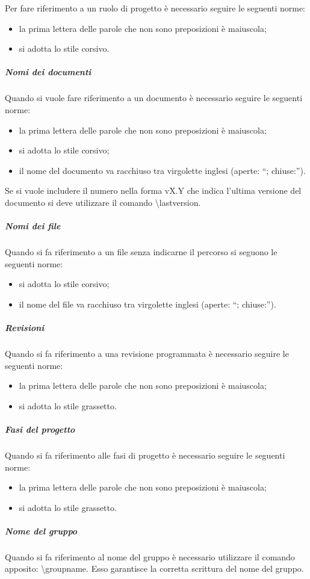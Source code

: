 					Per fare riferimento a un ruolo di progetto è necessario seguire le seguenti norme:
					\begin{itemize}
						\item la prima lettera delle parole che non sono preposizioni è maiuscola;
						\item si adotta lo stile corsivo.
					\end{itemize}
				\subparagraph{Nomi dei documenti}
					Quando si vuole fare riferimento a un documento è necessario seguire le seguenti norme:
					\begin{itemize}
						\item la prima lettera delle parole che non sono preposizioni è maiuscola;
						\item si adotta lo stile corsivo;
						\item il nome del documento va racchiuso tra virgolette inglesi (aperte: “; chiuse:”).
					\end{itemize}
					Se si vuole includere il numero nella forma vX.Y che indica l’ultima versione del documento si deve utilizzare il comando \latex{} \textbackslash lastversion{}.
				\subparagraph{Nomi dei file}
					Quando si fa riferimento a un file senza indicarne il percorso si seguono le seguenti norme:
					\begin{itemize}
						\item si adotta lo stile corsivo;
						\item il nome del file va racchiuso tra virgolette inglesi (aperte: “; chiuse:”).
					\end{itemize}
				\subparagraph{Revisioni}
					Quando si fa riferimento a una revisione programmata è necessario seguire le seguenti norme:
					\begin{itemize}
						\item la prima lettera delle parole che non sono preposizioni è maiuscola;
						\item si adotta lo stile grassetto.
					\end{itemize}
				\subparagraph{Fasi del progetto}
					Quando si fa riferimento alle fasi di progetto è necessario seguire le seguenti norme:
					\begin{itemize}
						\item la prima lettera delle parole che non sono preposizioni è maiuscola;
						\item si adotta lo stile grassetto.
					\end{itemize}
				\subparagraph{Nome del gruppo}
					Quando si fa riferimento al nome del gruppo è necessario utilizzare il comando \latex{} apposito: \textbackslash groupname{}. Esso garantisce la corretta scrittura del nome del gruppo.
